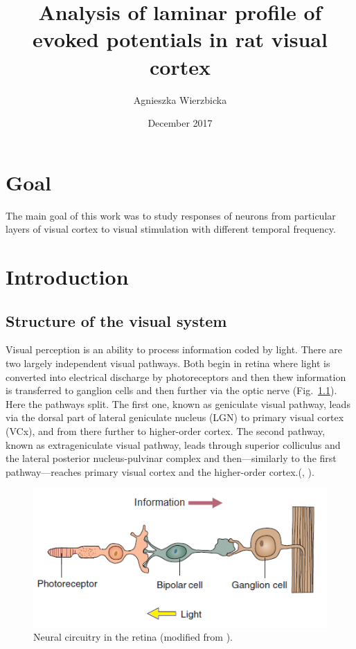 \documentclass{pracalicmgr}
\author{Agnieszka Wierzbicka}
\title{Analysis of laminar profile of evoked potentials in rat visual cortex}
\date{December 2017}
\begin{document}
    \maketitle
    \let\cleardoublepage\clearpage
    
    \begin{abstract}


     \end{abstract}

  
    \tableofcontents
    
    \chapter*{Goal}
    The main goal of this work was to study responses of neurons from particular layers of visual cortex to visual stimulation with different temporal frequency.
    
    \chapter{Introduction}
    
    \section{Structure of the visual system}
    Visual perception is an ability to process information coded by light. There are two largely independent visual pathways. Both begin in retina where light is converted into electrical discharge by photoreceptors and then thew information is transferred to ganglion cells and then further via the optic nerve (Fig.~\ref{rys:neural_circuitry}). Here the pathways split. The first one, known as geniculate visual pathway, leads via the dorsal part of lateral geniculate nucleus (LGN) to primary visual cortex (VCx), and from there further to higher-order cortex. The second pathway, known as extrageniculate visual pathway, leads through superior colliculus and the lateral posterior nucleus-pulvinar complex and then---similarly to the first pathway---reaches primary visual cortex and the higher-order cortex.(\cite{viola}, \cite{thomsonlayer6}). 
    \begin{figure}[htbp]
    	\begin{center}
    		\includegraphics[scale=0.9]{neural_circuitry.png}
    	\end{center}
    	\caption{Neural circuitry in the retina (modified from \cite{carlsonphysiology}).}
    	\label{rys:neural_circuitry}
    \end{figure}      
\end{document}
